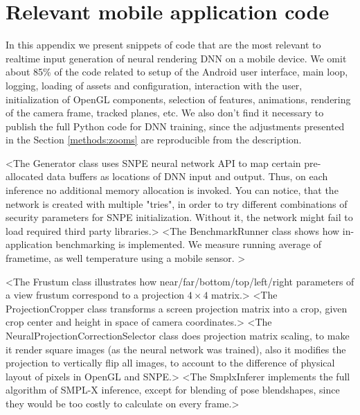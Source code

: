 \chapter{Relevant mobile application code}


In this appendix we present snippets of code that are the most relevant to realtime input generation of neural rendering DNN on a mobile device. We omit about 85\% of the code related to setup of the Android user interface, main loop, logging, loading of assets and configuration, interaction with the user, initialization of OpenGL components, selection of features, animations, rendering of the camera frame, tracked planes, etc. We also don't find it necessary to publish the full Python code for DNN training, since the adjustments presented in the Section \ref{methods:zooms} are reproducible from the description.


<The Generator class uses SNPE neural network API to map certain pre-allocated data buffers as locations of DNN input and output. Thus, on each inference no additional memory allocation is invoked. You can notice, that the network is created with multiple "tries", in order to try different combinations of security parameters for SNPE initialization. Without it, the network might fail to load required third party libraries.>
<The BenchmarkRunner class shows how in-application benchmarking is implemented. We measure running average of frametime, as well temperature using a mobile sensor. >


<The Frustum class illustrates how near/far/bottom/top/left/right parameters of a view frustum correspond to a projection $4\times4$ matrix.>
<The ProjectionCropper class transforms a screen projection matrix into a crop, given crop center and height in space of camera coordinates.>
<The NeuralProjectionCorrectionSelector class does projection matrix scaling, to make it render square images (as the neural network was trained), also it modifies the projection to vertically flip all images, to account to the difference of physical layout of pixels in OpenGL and SNPE.>
<The SmplxInferer implements the full algorithm of SMPL-X inference, except for blending of pose blendshapes, since they would be too costly to calculate on every frame.>

